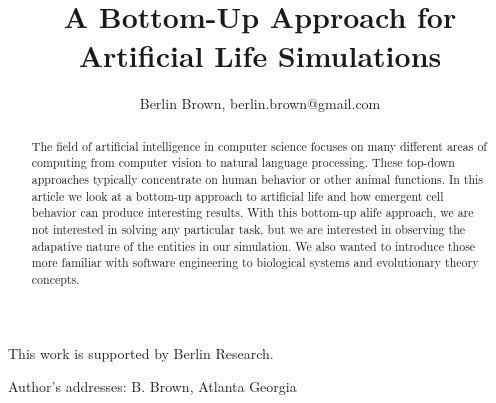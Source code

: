 \documentclass[prodmode,acmtecs]{acmsmall}
\begin{document}

\makeatletter
{}
\makeatother

\title{A Bottom-Up Approach for Artificial Life Simulations}
\author{Berlin Brown, berlin.brown@gmail.com
}

\begin{abstract}
The field of artificial intelligence in computer science focuses on many
different areas of computing from computer vision to natural language
processing. These top-down approaches typically concentrate on human behavior or
other animal functions. In this article we look at a bottom-up approach to
artificial life and how emergent cell behavior can produce interesting results. 
With this bottom-up alife approach, we are not interested in solving any
particular task, but we are interested in observing the adapative nature of the
entities in our simulation. We also wanted to introduce those more familiar with
software engineering to biological systems and evolutionary theory concepts.
\end{abstract}




\begin{bottomstuff}
This work is supported by Berlin Research.

Author's addresses: B. Brown, Atlanta Georgia
\end{bottomstuff}

\maketitle
\end{document}
